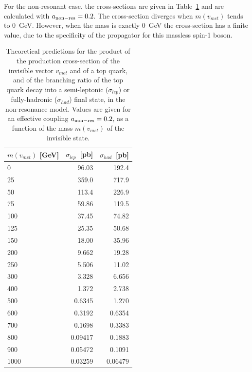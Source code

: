 For the non-resonant case, the cross-sections are given in Table~\ref{tab:S4R_Xsec} and are calculated with $a_{\mathrm{non-res}}=0.2$.
The cross-section diverges when $m(v_{met})$ tends to 0~GeV.  However, when the mass is exactly 0~GeV the cross-section has a finite value,
due to the specificity of the propagator for this massless spin-1 boson.
\begin{table}[!htb]\centering
\begin{tabular}{l|r|r}
\hline \hline
$m(v_{met})$ [GeV] & $\sigma_{lep}$~[pb] & $\sigma_{had}$~[pb] \\
\hline \hline
0                  &  96.03              & 192.4    \\
25                 &  359.0              & 717.9    \\
50                 &  113.4              & 226.9    \\
75                 &  59.86              & 119.5    \\
100                &  37.45              & 74.82    \\
125                &  25.35              & 50.68    \\
150                &  18.00              & 35.96    \\
200                &  9.662              & 19.28    \\
250                &  5.506              & 11.02    \\
300                &  3.328              & 6.656    \\
400                &  1.372              & 2.738    \\
500                &  0.6345             & 1.270    \\
600                &  0.3192             & 0.6354   \\
700                &  0.1698             & 0.3383   \\
800                &  0.09417            & 0.1883   \\
900                &  0.05472            & 0.1091   \\
1000               &  0.03259            & 0.06479  \\
\hline \hline
\end{tabular}
\caption
{
Theoretical predictions for the product of the production cross-section of the invisible vector $v_{met}$ and of a top quark,
and of the branching ratio of the top quark decay into a semi-leptonic ($\sigma_{lep}$) or fully-hadronic ($\sigma_{had}$) final state, 
in the non-resonance model.
Values are given for an effective coupling $a_{\mathrm{non-res}}=0.2$, as a function of the mass $m(v_{met})$ of the invisible state.
}
\label{tab:S4R_Xsec}
\end{table}

